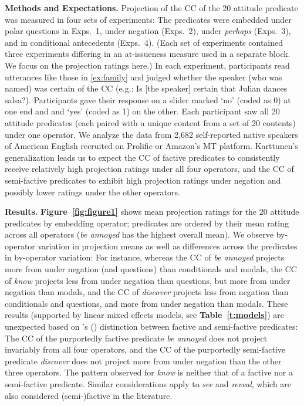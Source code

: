 \documentclass[12pt, letterpaper]{article}
\newcommand{\posscite}[1]{\citeauthor{#1}'s (\citeyear{#1})}
\begin{document}
\noindent
{\bf Methods and Expectations.}
	Projection of the CC of the 20 attitude predicate was measured in four sets of experiments: The predicates were embedded under polar questions in Exps.~1, under negation (Exps.~2), under {\em perhaps} (Exps.~3), and in conditional antecedents (Exps.~4). (Each set of experiments contained three experiments differing in an at-issueness measure used in a separate block. We focus on the projection ratings here.) In each experiment, participants read utterances like those in \ref{ex:family} and judged whether the speaker (who was named) was certain of the CC (e.g.: Is [the speaker] certain that Julian dances salsa?). Participants gave their response on a slider marked `no' (coded as 0) at one end and and `yes' (coded as 1) on the other. Each participant saw all 20 attitude predicates (each paired with a unique content from a set of 20 contents) under one operator. We analyze the data from 2,682 self-reported native speakers of American English recruited on Prolific or Amazon's MT platform. Karttunen's generalization leads us to expect the CC of factive predicates to consistently receive relatively high projection ratings under all four operators, and the CC of semi-factive predicates to exhibit high projection ratings under negation and possibly lower ratings under the other operators.

\noindent
{\bf Results.}
	\textbf{Figure~\ref{fig:figure1}} shows mean projection ratings for the 20 attitude predicates by embedding operator; predicates are ordered by their mean rating across all operators (\emph{be annoyed} has the highest overall mean). We observe by-operator variation in projection means as well as differences across the predicates in by-operator variation: For instance, whereas the CC of \emph{be annoyed} projects more from under negation (and questions) than conditionals and modals, the CC of \emph{know} projects less from under negation than questions, but more from under negation than modals, and the CC of \emph{discover} projects less from negation than conditionals and questions, and more from under negation than modals.
	These results (supported by linear mixed effects models, see \textbf{Table~\ref{t:models}}) are unexpected 
	based on \posscite{karttunen_observations_1971} distinction between factive and semi-factive predicates: The CC of the purportedly factive predicate \emph{be annoyed} does not project invariably from all four operators, and the CC of the purportedly semi-factive predicate \emph{discover} does not project more from under negation than the other three operators. The pattern observed for {\em know} is neither that of a factive nor a semi-factive predicate. Similar considerations apply to \emph{see} and \emph{reveal}, which are also considered (semi-)factive in the literature.
\end{document}
